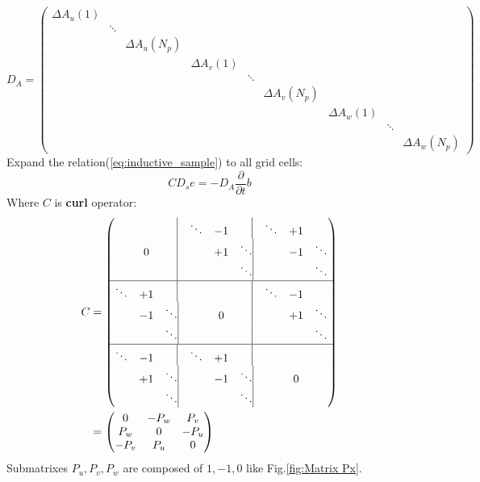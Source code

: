 \begin{equation}
D_{A}=
	\begin{pmatrix}
	\Delta A_{u}(1)&&&&&&&&\\
	&\ddots &&&&&&&\\
	&&\Delta A_{u}(N_{p})&&&&&&\\
	&&&\Delta A_{v}(1)&&&&&\\
	&&&&\ddots &&&&\\
	&&&&&\Delta A_{v}(N_{p})&&&\\
	&&&&&&\Delta A_{w}(1)&&\\
	&&&&&&&\ddots &\\
	&&&&&&&&\Delta A_{w}(N_{p})
	\end{pmatrix}
	\label{eq:Da_matrix}
\end{equation}
Expand the relation(\ref{eq:inductive_sample}) to all grid cells\cite{FIT_discrete_method}\cite{FIT_discrete_electrommagnetism}\cite{FIT_triangular_discretization}\cite{script_FeldSim}:
\begin{equation}
CD_{s}e=-D_{A}\frac{\partial}{\partial{t}}b
\label{eq:inductive_sample_all}
\end{equation}
Where $C$ is \textbf{curl} operator:
\begin{align}
C&=
	\begin{pmatrix}
	&&\quad\vline &\ddots &-1&\quad\vline  &\ddots &+1&\\	
	&0&\quad\vline	& &+1 &\ddots\vline	 &&-1&\ddots\\
	&&\quad\vline	&&&\ddots\vline			 &&&\ddots\\	
	\hline
	\ddots &+1&\quad\vline	&&&\quad\vline	 &\ddots &-1&\\
	&-1 &\ddots\vline	&&0&\quad\vline	&&+1&\ddots\\
	&&\ddots\vline	&&&\quad\vline	&&&\ddots\\
	\hline
	\ddots &-1&\quad\vline &\ddots &+1&\quad\vline	&&&\\
	&+1 &\ddots\vline	&&-1&\ddots\vline	&&0&\\
	&&\ddots\vline		&&&\ddots\vline	&&&
	\end{pmatrix}\nonumber\\
	&=
	\begin{pmatrix}
	0&-P_{w}&P_{v}\\
	P_{w}&0&-P_{u}\\
	-P_{v}&P_{u}&0
	\end{pmatrix}
\label{eq:C_matrix}
\end{align}
Submatrixes $P_{u},P_{v},P_{w}$ are composed of $1,-1,0$ like Fig.\ref{fig:Matrix Px}. 
